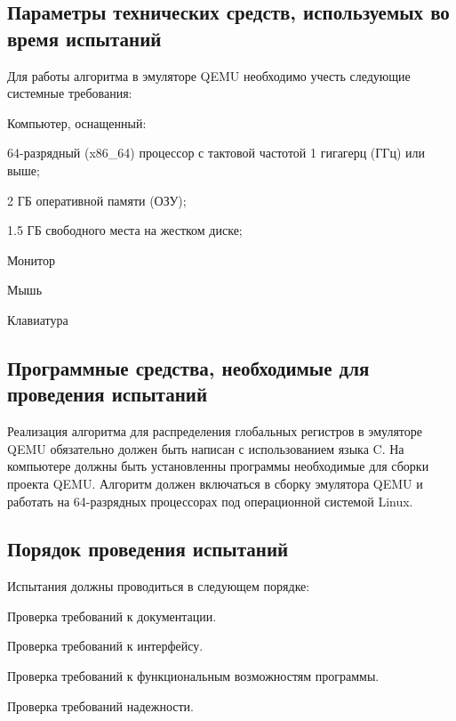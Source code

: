 \subsection{Параметры технических средств, используемых во время испытаний}
Для работы алгоритма в эмуляторе QEMU необходимо учесть следующие системные требования:
\begin{my_enumerate}
\item Компьютер, оснащенный:
    \begin{my_enumerate}
    \item 64-разрядный (x86\_64) процессор с тактовой частотой 1 гигагерц (ГГц) или выше;
    \item 2 ГБ оперативной памяти (ОЗУ);
    \item 1.5 ГБ свободного места на жестком диске;
    \end{my_enumerate}
\item Монитор
\item Мышь
\item Клавиатура
\end{my_enumerate}


\subsection{Программные средства, необходимые для проведения испытаний}
Реализация алгоритма для распределения глобальных регистров в эмуляторе QEMU обязательно должен быть написан с использованием языка C. На компьютере должны быть установленны программы необходимые для сборки проекта QEMU. Алгоритм должен включаться в сборку эмулятора QEMU и работать на 64-разрядных процессорах под операционной системой Linux.


\subsection{Порядок проведения испытаний}
Испытания должны проводиться в следующем порядке:
\begin{my_enumerate}
\item Проверка требований к документации.
\item Проверка требований к интерфейсу.
\item Проверка требований к функциональным возможностям программы.
\item Проверка требований надежности.
\end{my_enumerate}


